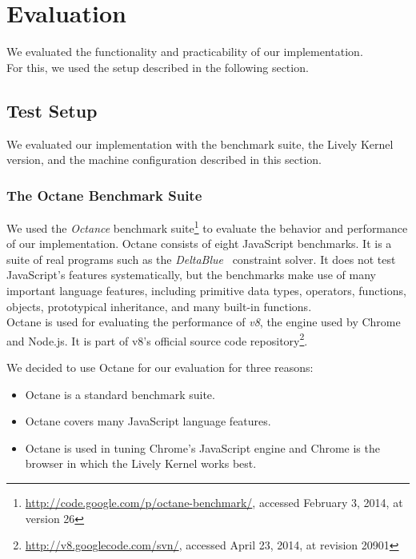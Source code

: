 \chapter{Evaluation} \label{chapter:EVALUATION}

We evaluated the functionality and practicability of our implementation.\\
For this, we used the setup described in the following section.


\section{Test Setup} \label{sec:EVALUATION:1}

We evaluated our implementation with the benchmark suite, the Lively Kernel version, and the machine configuration described in this section.

\subsection{The Octane Benchmark Suite}

We used the \emph{Octance} benchmark suite\footnote{\url{http://code.google.com/p/octane-benchmark/}, accessed February 3, 2014, at version 26} to evaluate the behavior and performance of our implementation.
Octane consists of eight JavaScript benchmarks.
It is a suite of real programs such as the \emph{DeltaBlue}~\cite{FreemanBenson1990ICS} constraint solver.
It does not test JavaScript's features systematically, but the benchmarks make use of many important language features, including primitive data types, operators, functions, objects, prototypical inheritance, and many built-in functions.\\
Octane is used for evaluating the performance of \emph{v8}, the engine used by Chrome and Node.js.
It is part of v8's official source code repository\footnote{\url{http://v8.googlecode.com/svn/}, accessed April 23, 2014, at revision 20901}.

We decided to use Octane for our evaluation for three reasons:

\begin{itemize}
    \item Octane is a standard benchmark suite.
    \item Octane covers many JavaScript language features.
    \item Octane is used in tuning Chrome's JavaScript engine and Chrome is the browser in which the Lively Kernel works best.
\end{itemize}


